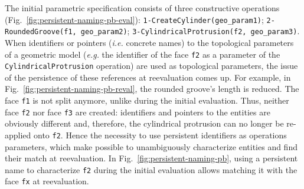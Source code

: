 The initial parametric specification consists of three constructive operations (Fig.~\ref{fig:persistent-naming-pb-eval}):
{\small
\texttt{1-Create\-Cylinder(geo\_param1)}; %
\texttt{2-Rounded\-Groove(f1, geo\_param2)}; %
\texttt{3-Cylindrical\-Protrusion(f2, geo\_param3)}}. %
When identifiers or pointers (\textit{i.e.} concrete names) to the topological parameters of a 
geometric model (\textit{e.g.} the identifier of the face \verb+f2+ as a parameter of
the \verb+CylindricalProtrusion+ operation) are used as topological
parameters, the issue of the persistence of these references at
reevaluation comes up. For example, in Fig.~\ref{fig:persistent-naming-pb-reval},
the rounded groove's length is reduced. The
face \verb+f1+ is not split  anymore, unlike  during
the initial evaluation. Thus, neither face \verb+f2+ nor face \verb+f3+ are created:  identifiers and pointers to the entities are obviously different and, therefore, the cylindrical protrusion can
no longer be re-applied onto \verb+f2+. 
Hence the necessity to use persistent
identifiers as operations parameters, which make possible to
unambiguously characterize entities and find their match at
reevaluation. In Fig.~\ref{fig:persistent-naming-pb}, using a persistent name to characterize
 \verb+f2+ %
 during the initial evaluation  allows matching it with the face \verb+fx+ at reevaluation.

